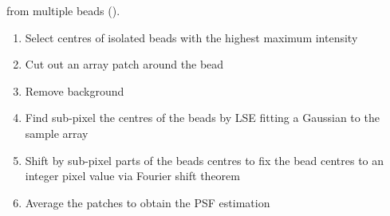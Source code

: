     from multiple beads ().


\begin{enumerate}
    \item Select centres of isolated beads with the highest maximum intensity
    \item Cut out an array patch around the bead
    \item Remove background %
    \item Find sub-pixel the centres of the beads by \ac{LSE} fitting a Gaussian to the sample array
    \item Shift by sub-pixel parts of the beads centres to fix the bead centres to an integer pixel value via Fourier
        shift theorem
    \item Average the patches to obtain the \ac{PSF} estimation
\end{enumerate}
